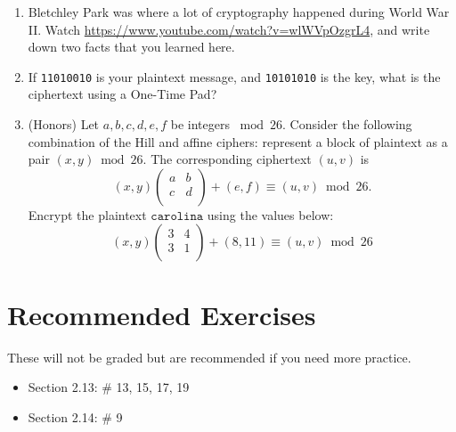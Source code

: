 \documentclass[12pt]{amsart}
\theoremstyle{plain}
\theoremstyle{definition}
\begin{document}
\begin{enumerate}[1.]
\begin{enumerate}[a.]
			\begin{framed}
			\vspace{.5in}
			\end{framed}
	\end{enumerate}
	\item Bletchley Park was where a lot of cryptography happened during World War II.  Watch \url{https://www.youtube.com/watch?v=wlWVpOzgrL4}, and write down two facts that you learned here.
	\begin{framed}
	\vspace{1.5in}
	\end{framed}
	\item If \texttt{11010010} is your plaintext message, and \texttt{10101010} is the key, what is the ciphertext using a One-Time Pad? 
	\begin{framed}
	\vspace{1in}
	\end{framed}
	 \item (Honors) Let $a,b,c,d,e,f$ be integers $\bmod 26$.  Consider the following combination of the Hill and affine ciphers: represent a block of plaintext as a pair $(x,y) \bmod 26$.  The corresponding ciphertext $(u,v)$ is 
	 $$(x,y)\left(\begin{array}{ll}
	 a&b\\
	 c&d\\
	\end{array}\right)+(e,f) \equiv (u,v) \bmod 26.$$  
	Encrypt the plaintext $\texttt{carolina}$ using the values below:
	$$(x,y)\left(\begin{array}{ll}
	 3&4\\
	 3&1\\
	\end{array}\right)+(8,11) \equiv (u,v) \bmod 26$$  
	\begin{framed}
	\vspace{5in}
	\end{framed}
\end{enumerate}

\section{Recommended Exercises}
\noindent These will not be graded but are recommended if you need more practice.
\begin{itemize}
	\item Section 2.13: \# 13, 15, 17, 19
	\item Section 2.14: \# 9
\end{itemize}
	
\end{document}
